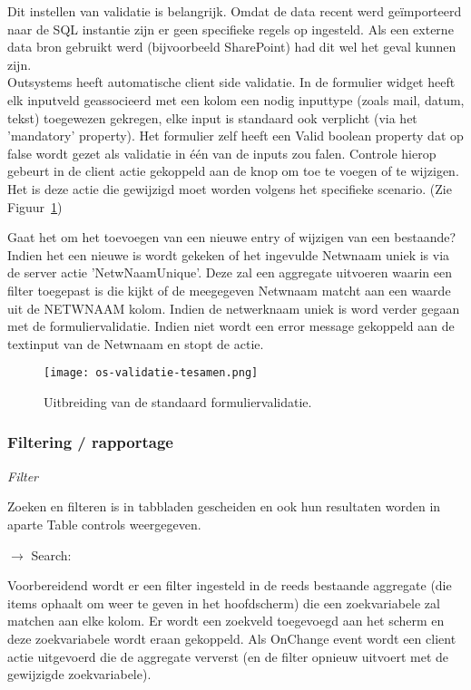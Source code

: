 Dit instellen van validatie is belangrijk. Omdat de data recent werd geïmporteerd naar de SQL instantie zijn er geen specifieke regels op ingesteld. Als een externe data bron gebruikt werd (bijvoorbeeld SharePoint) had dit wel het geval kunnen zijn.\\
Outsystems heeft automatische client side validatie. \autocite{OutSystemsDocs} In de formulier widget heeft elk inputveld geassocieerd met een kolom een nodig inputtype (zoals mail, datum, tekst) toegewezen gekregen, elke input is standaard ook verplicht (via het 'mandatory' property). Het formulier zelf heeft een Valid boolean property dat op false wordt gezet als validatie in één van de inputs zou falen. Controle hierop gebeurt in de client actie gekoppeld aan de knop om toe te voegen of te wijzigen. Het is deze actie die gewijzigd moet worden volgens het specifieke scenario. (Zie Figuur~\ref{fig:os-validatie-tesamen})

Gaat het om het toevoegen van een nieuwe entry of wijzigen van een bestaande? Indien het een nieuwe is wordt gekeken of het ingevulde Netwnaam uniek is via de server actie 'NetwNaamUnique'. Deze zal een aggregate uitvoeren waarin een filter toegepast is  die kijkt of de meegegeven Netwnaam matcht aan een waarde uit de NETWNAAM kolom. Indien de netwerknaam uniek is word verder gegaan met de formuliervalidatie. Indien niet wordt een error message gekoppeld aan de textinput van de Netwnaam en stopt de actie.

\begin{figure}[h!]
    \texttt{[image: os-validatie-tesamen.png]}
    \caption{Uitbreiding van de standaard formuliervalidatie.}
    \label{fig:os-validatie-tesamen}
\end{figure}

\subsubsection{Filtering / rapportage}

\textit{Filter}

Zoeken en filteren is in tabbladen gescheiden en ook hun resultaten worden in aparte Table controls weergegeven.

$\rightarrow$ Search:

Voorbereidend wordt er een filter ingesteld in de reeds bestaande aggregate (die items ophaalt om weer te geven in het hoofdscherm) die een zoekvariabele zal matchen aan elke kolom.
Er wordt een zoekveld toegevoegd aan het scherm en deze zoekvariabele wordt eraan gekoppeld. Als OnChange event wordt een client actie uitgevoerd die de aggregate ververst (en de filter opnieuw uitvoert met de gewijzigde zoekvariabele).

